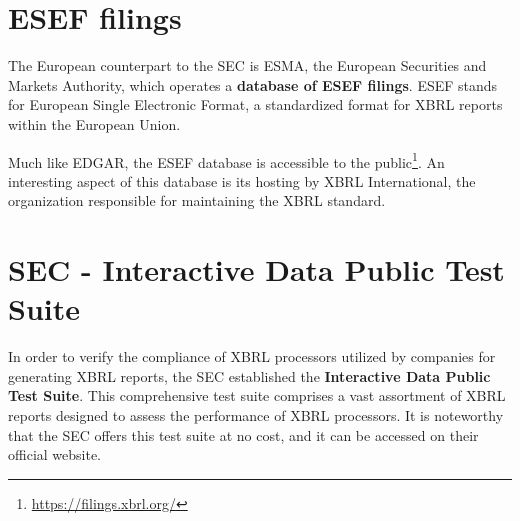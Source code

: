 \section{ESEF filings}
The European counterpart to the SEC is ESMA, 
the European Securities and Markets Authority, 
which operates a 
\textcolor{tropicalrainforest}{\textbf{database of ESEF filings}}\cite{esma_database}. 
ESEF stands for European Single Electronic Format, 
a standardized format for XBRL reports within the European Union.

Much like EDGAR, the ESEF database is accessible to the public\footnote{\url{https://filings.xbrl.org/}}. 
An interesting aspect of this database is its hosting by XBRL International, the organization responsible for maintaining the XBRL standard.

\section{SEC - Interactive Data Public Test Suite}
\label{sec:idpts}
In order to verify the compliance of XBRL processors utilized by companies for generating XBRL reports, 
the SEC established the 
\textcolor{turkishrose}{\textbf{Interactive Data Public Test Suite}}\cite{sec_idpts}.
This comprehensive test suite comprises a vast assortment of XBRL reports designed to assess the performance of XBRL processors.
It is noteworthy that the SEC offers this test suite at no cost, and it can be accessed on their official website.

